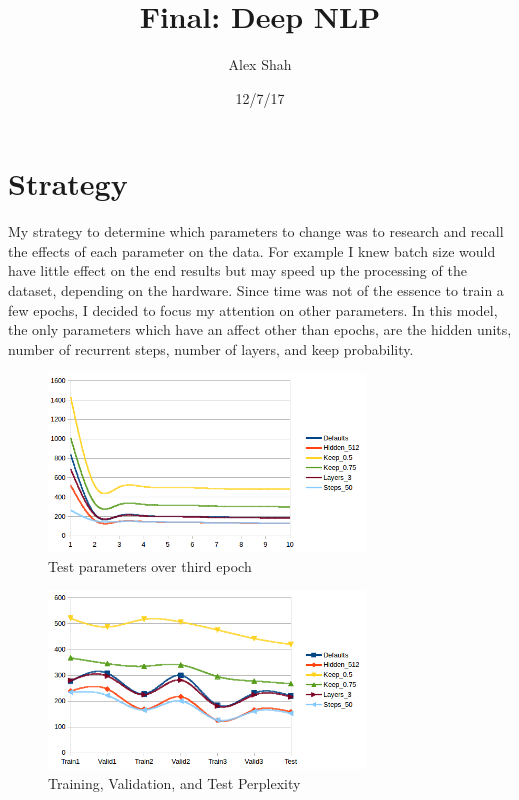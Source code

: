 \documentclass[10pt,a4paper]{report}
\begin{document}
\title{Final: Deep NLP}
\author{Alex Shah}
\date{12/7/17}

\maketitle

\section{Strategy}

My strategy to determine which parameters to change was to research and recall the effects of each parameter on the data. For example I knew batch size would have little effect on the end results but may speed up the processing of the dataset, depending on the hardware. Since time was not of the essence to train a few epochs, I decided to focus my attention on other parameters. In this model, the only parameters which have an affect other than epochs, are the hidden units, number of recurrent steps, number of layers, and keep probability.


\begin{figure}[H]
  \begin{center}
    \includegraphics[width=0.75\textwidth]{epochs.png}
    \caption{Test parameters over third epoch}
  \end{center}
\end{figure}


\begin{figure}[H]
  \begin{center}
    \includegraphics[width=0.75\textwidth] {train-valid-test.png}
    \caption{Training, Validation, and Test Perplexity}
  \end{center}
\end{figure}
\end{document}
